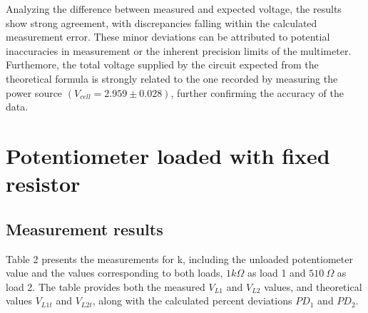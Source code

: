\documentclass[a4paper]{article}
\begin{document}
Analyzing the difference between measured and expected voltage, 
the results show strong agreement,
with discrepancies falling within the calculated measurement error. 
These minor deviations can be attributed to potential inaccuracies
in measurement or the inherent precision limits of the multimeter.
Furthemore, the total voltage supplied by the circuit 
expected from the theoretical formula is strongly related to the one recorded
by measuring the power source $(V_{cell} = 2.959 \pm 0.028)$, further confirming the accuracy of the data.
\newpage
\section{Potentiometer loaded with fixed resistor}
\subsection{Measurement results}
Table 2 presents the measurements for k,
including the unloaded potentiometer value and the values corresponding to both loads,
$1 k\Omega$ as load 1 and $510~\Omega$ as load 2.
The table provides both the measured $V_{L1}$ and $V_{L2}$ values, and theoretical values $V_{L1t}$ and $V_{L2t}$, 
along with the calculated percent deviations $PD_1$ and $PD_2$.
\end{document}
